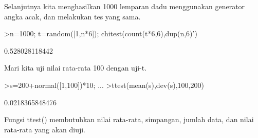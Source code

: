 \documentclass{article}
\begin{document}
\begin{eulernotebook}
\begin{eulercomment}
\begin{eulercomment}
\begin{eulercomment}
Selanjutnya kita menghasilkan 1000 lemparan dadu menggunakan generator
angka acak, dan melakukan tes yang sama.
\end{eulercomment}
\begin{eulerprompt}
>n=1000; t=random([1,n*6]); chitest(count(t*6,6),dup(n,6)')
\end{eulerprompt}
\begin{euleroutput}
  0.528028118442
\end{euleroutput}
\begin{eulercomment}
Mari kita uji nilai rata-rata 100 dengan uji-t.
\end{eulercomment}
\begin{eulerprompt}
>s=200+normal([1,100])*10; ...
>ttest(mean(s),dev(s),100,200)
\end{eulerprompt}
\begin{euleroutput}
  0.0218365848476
\end{euleroutput}
\begin{eulercomment}
Fungsi ttest() membutuhkan nilai rata-rata, simpangan, jumlah data,
dan nilai rata-rata yang akan diuji.


\end{eulercomment}
\end{eulercomment}
\end{eulercomment}
\end{eulernotebook}
\end{document}
